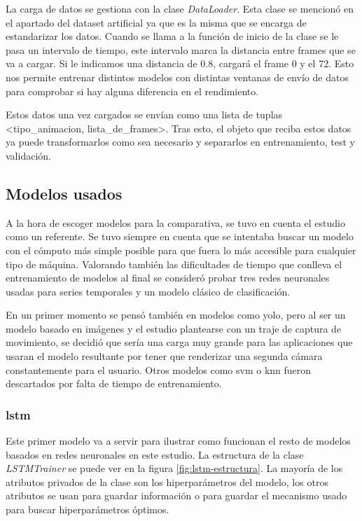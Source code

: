 La carga de datos se gestiona con la clase \textit{DataLoader}. Esta clase se mencionó en el apartado del dataset artificial ya que es la misma que se encarga de estandarizar los datos. Cuando se llama a la función de inicio de la clase se le pasa un intervalo de tiempo, este intervalo marca la distancia entre frames que se va a cargar. Si le indicamos una distancia de 0.8, cargará el frame 0 y el 72. Esto nos permite entrenar distintos modelos con distintas ventanas de envío de datos para comprobar si hay alguna diferencia en el rendimiento.

Estos datos una vez cargados se envían como una lista de tuplas <tipo\_animacion, lista\_de\_frames>. Tras esto, el objeto que reciba estos datos ya puede transformarlos como sea necesario y separarlos en entrenamiento, test y validación.

\subsection{Modelos usados}

A la hora de escoger modelos para la comparativa, se tuvo en cuenta el estudio \cite{combining3dskeleton} como un referente. Se tuvo siempre en cuenta que se intentaba buscar un modelo con el cómputo más simple posible para que fuera lo más accesible para cualquier tipo de máquina. Valorando también las dificultades de tiempo que conlleva el entrenamiento de modelos al final se consideró probar tres redes neuronales usadas para series temporales y un modelo clásico de clasificación.

En un primer momento se pensó también en modelos como \gls{yolo}, pero al ser un modelo basado en imágenes y el estudio plantearse con un traje de captura de movimiento, se decidió que sería una carga muy grande para las aplicaciones que usaran el modelo resultante por tener que renderizar una segunda cámara constantemente para el usuario. Otros modelos como \gls{svm} o \gls{knn} fueron descartados por falta de tiempo de entrenamiento.
\subsubsection{\gls{lstm}}

Este primer modelo va a servir para ilustrar como funcionan el resto de modelos basados en redes neuronales en este estudio. La estructura de la clase \textit{LSTMTrainer} se puede ver en la figura \ref{fig:lstm-estructura}. La mayoría de los atributos privados de la clase son los hiperparámetros del modelo, los otros atributos se usan para guardar información o para guardar el mecanismo usado para buscar hiperparámetros óptimos.

